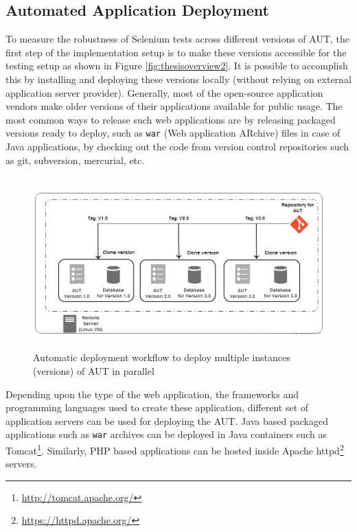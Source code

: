 \subsection{Automated Application Deployment}
\label{sec:autoDeployment}




To measure the robustness of Selenium tests across different versions of AUT, the first step of the implementation setup is to make these versions accessible for the testing setup as shown in Figure \ref{fig:thesisoverview2}. It is possible to accomplish this by installing and deploying these versions locally (without relying on external application server provider). Generally, most of the open-source application vendors make older versions of their applications available for public usage. The most common ways to release such web applications are by releasing packaged versions ready to deploy, such as \texttt{war} (Web application ARchive) files in case of Java applications, by checking out the code from version control repositories such as git, subversion, mercurial, etc.

\begin{figure}[h]
\makeatletter 
\makeatother
    \centering
  \includegraphics[width=5.4in,height=2.6in]{./Figures/Deployment_Process_2.jpg}
  \captionsetup{justification=raggedright,
singlelinecheck=false
}
  \caption{Automatic deployment workflow to deploy multiple instances (versions) of AUT in parallel}
  \label{fig:deployment} 
\end{figure}

Depending upon the type of the web application, the frameworks and programming languages used to create these application, different set of application servers can be used for deploying the AUT. Java based packaged applications such as \texttt{war} archives can be deployed in Java containers such as Tomcat\footnote{\url{http://tomcat.apache.org/}}. Similarly, PHP based applications can be hosted inside Apache httpd\footnote{\url{https://httpd.apache.org/}} servers. 

